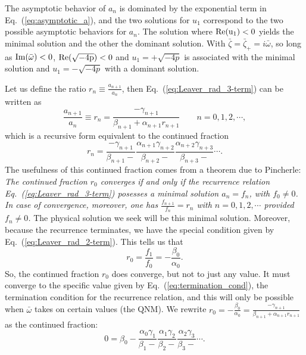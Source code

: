 \documentclass[11pt]{article}
\begin{document}
The asymptotic behavior of $a_n$ is dominated by the exponential term
in Eq.~(\ref{eq:asymptotic_a}), and the two solutions for $u_1$
correspond to the two possible asymptotic behaviors for $a_n$.  The
solution where $\rm{Re}(u_1)<0$ yields the minimal solution and the
other the dominant solution.  With
$\bar\zeta=\bar\zeta_+=i\bar\omega$, so long as
$\rm{Im}(\bar\omega)<0$, $\rm{Re}(\sqrt{-4p})<0$ and $u_1=+\sqrt{-4p}$
is associated with the minimal solution and $u_1=-\sqrt{-4p}$ with a
dominant solution.

Let us define the ratio $r_n\equiv\frac{a_{n+1}}{a_n}$, then
Eq.~(\ref{eq:Leaver_rad_3-term}) can be written as
\begin{equation}
  \frac{a_{n+1}}{a_n} \equiv r_n 
  = \frac{-\gamma_{n+1}}{\beta_{n+1}+ \alpha_{n+1}r_{n+1}}
  \qquad n=0,1,2,\cdots,
\end{equation}
which is a recursive form equivalent to the continued fraction
\begin{equation}\label{eq:Leaver_rad_CF_dom}
r_n 
  = \frac{-\gamma_{n+1}}{\beta_{n+1}-} 
    \frac{\alpha_{n+1}\gamma_{n+2}}{\beta_{n+2}-}
    \frac{\alpha_{n+2}\gamma_{n+3}}{\beta_{n+3}-}\cdots.
\end{equation}
The usefulness of this continued fraction comes from a theorem due to
Pincherle:
 \\ {\em The continued fraction $r_0$ converges if and only
  if the recurrence relation Eq.~(\ref{eq:Leaver_rad_3-term}) posesses
  a minimal solution $a_n=f_n$, with $f_0\ne0$.  In case of
  convergence, moreover, one has $\frac{f_{n+1}}{f_n}=r_n$ with
  $n=0,1,2,\cdots$ provided $f_n\ne0$.}  The physical solution we seek
will be this minimal solution.  Moreover, because the recurrence
terminates, we have the special condition given by
Eq.~(\ref{eq:Leaver_rad_2-term}).  This tells us that
\begin{equation}\label{eq:termination_cond}
  r_0=\frac{f_1}{f_0}=-\frac{\beta_0}{\alpha_0}.
\end{equation}
So, the continued fraction $r_0$ does converge, but not to just any
value.  It must converge to the specific value given by
Eq.~(\ref{eq:termination_cond}), the termination condition for the
recurrence relation, and this will only be possible when $\bar\omega$
takes on certain values (the QNM).  We rewrite
$r_0=-\frac{\beta_0}{\alpha_0}=\frac{-\gamma_{n+1}}{\beta_{n+1}+
  \alpha_{n+1}r_{n+1}}$ as the continued fraction:
\begin{equation}\label{eq:Leaver_Cf_inf}
  0=\beta_0 -\frac{\alpha_0\gamma_1}{\beta_1-}
             \frac{\alpha_1\gamma_2}{\beta_2-}
             \frac{\alpha_2\gamma_3}{\beta_3-}\cdots.
\end{equation}
\end{document}
